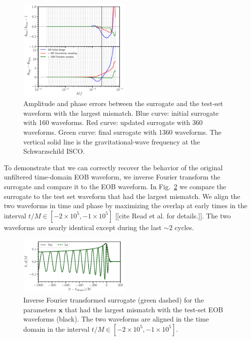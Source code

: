 \documentclass[prd,aps,letter,twocolumn,floatfix,notitlepage,nofootinbib]{revtex4-1}
\def\bx{\mathbf{x}}
\begin{document}
\begin{figure}[htb]
\centering
\includegraphics[width=0.49\textwidth]{htildemaxerror.pdf}
\caption{Amplitude and phase errors between the surrogate and the test-set waveform with the largest mismatch. Blue curve: initial surrogate with 160 waveforms. Red curve: updated surrogate with 360 waveforms. Green curve: final surrogate with 1360 waveforms. The vertical solid line is the gravitational-wave frequency at the Schwarzschild ISCO.}
\label{fig:maxmismatch}
\end{figure}

To demonstrate that we can correctly recover the behavior of the original unfiltered time-domain EOB waveform, we inverse Fourier transform the surrogate and compare it to the EOB waveform. In Fig.~\ref{fig:maxmismatchtd} we compare the surrogate to the test set waveform that had the largest mismatch. We align the two waveforms in time and phase by maximizing the overlap at early times in the interval $t/M \in [-2\times 10^5, -1\times 10^5]$ [[cite Read et al. for details.]]. The two waveforms are nearly identical except during the last $\sim 2$ cycles.

\begin{figure}[htb]
\centering
\includegraphics[width=0.49\textwidth]{hmaxerror.pdf}
\caption{Inverse Fourier transformed surrogate (green dashed) for the parameters $\bx$ that had the largest mismatch with the test-set EOB waveforms (black). The two waveforms are aligned in the time domain in the interval $t/M \in [-2\times 10^5, -1\times 10^5]$.}
\label{fig:maxmismatchtd}
\end{figure}
\end{document}
